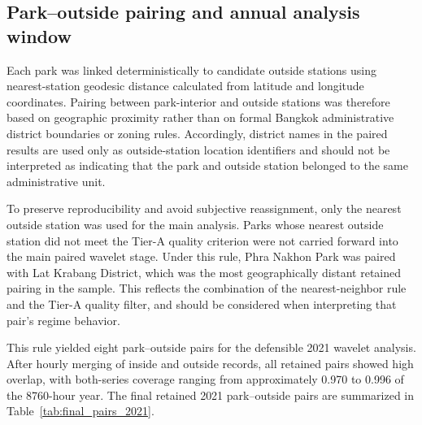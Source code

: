 \subsection{Park--outside pairing and annual analysis window}

Each park was linked deterministically to candidate outside stations using nearest-station geodesic distance calculated from latitude and longitude coordinates. Pairing between park-interior and outside stations was therefore based on geographic proximity rather than on formal Bangkok administrative district boundaries or zoning rules. Accordingly, district names in the paired results are used only as outside-station location identifiers and should not be interpreted as indicating that the park and outside station belonged to the same administrative unit.

To preserve reproducibility and avoid subjective reassignment, only the nearest outside station was used for the main analysis. Parks whose nearest outside station did not meet the Tier-A quality criterion were not carried forward into the main paired wavelet stage. Under this rule, Phra Nakhon Park was paired with Lat Krabang District, which was the most geographically distant retained pairing in the sample. This reflects the combination of the nearest-neighbor rule and the Tier-A quality filter, and should be considered when interpreting that pair's regime behavior.

This rule yielded eight park--outside pairs for the defensible 2021 wavelet analysis. After hourly merging of inside and outside records, all retained pairs showed high overlap, with both-series coverage ranging from approximately 0.970 to 0.996 of the 8760-hour year. The final retained 2021 park--outside pairs are summarized in Table~\ref{tab:final_pairs_2021}.

